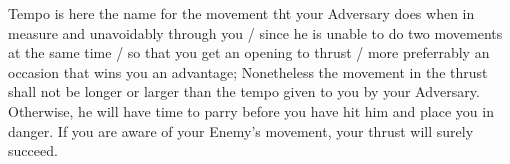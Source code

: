 

Tempo is here the name for the movement tht your Adversary does when
in measure and unavoidably through you / since he is unable to do two
movements at the same time / so that you get an opening to thrust /
more preferrably an occasion that wins you an advantage; Nonetheless
the movement in the thrust shall not be longer or larger than the
tempo given to you by your Adversary. Otherwise, he will have time to
parry before you have hit him and place you in danger. If you are
aware of your Enemy's movement, your thrust will surely succeed.
